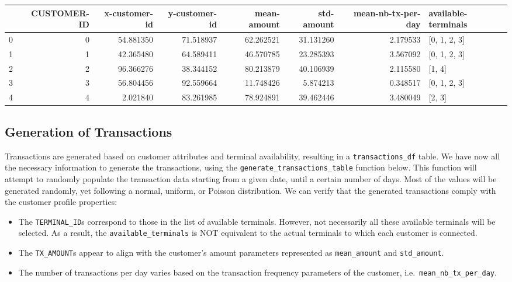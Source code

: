             
    
    \begin{center}
\footnotesize
\begin{tabular}{lrrrrrrl}
\toprule
 & CUSTOMER-ID & x-customer-id & y-customer-id & mean-amount & std-amount & mean-nb-tx-per-day & available-terminals \\
\midrule
0 & 0 & 54.881350 & 71.518937 & 62.262521 & 31.131260 & 2.179533 & [0, 1, 2, 3] \\
1 & 1 & 42.365480 & 64.589411 & 46.570785 & 23.285393 & 3.567092 & [0, 1, 2, 3] \\
2 & 2 & 96.366276 & 38.344152 & 80.213879 & 40.106939 & 2.115580 & [1, 4] \\
3 & 3 & 56.804456 & 92.559664 & 11.748426 & 5.874213 & 0.348517 & [0, 1, 2, 3] \\
4 & 4 & 2.021840 & 83.261985 & 78.924891 & 39.462446 & 3.480049 & [2, 3] \\
\bottomrule
\end{tabular}

\end{center}

    

    \hypertarget{generation-of-transactions}{%
\subsection{Generation of
Transactions}\label{generation-of-transactions}}

    Transactions are generated based on customer attributes and terminal
availability, resulting in a \texttt{transactions\_df} table. We have
now all the necessary information to generate the transactions, using
the \texttt{generate\_transactions\_table} function below. This function
will attempt to randomly populate the transaction data starting from a
given date, until a certain number of days. Most of the values will be
generated randomly, yet following a normal, uniform, or Poisson
distribution. We can verify that the generated transactions comply with
the customer profile properties:

\begin{itemize}
\tightlist
\item
  The \texttt{TERMINAL\_ID}s correspond to those in the list of
  available terminals. However, not necessarily all these available
  terminals will be selected. As a result, the
  \texttt{available\_terminals} is NOT equivalent to the actual
  terminals to which each customer is connected.
\item
  The \texttt{TX\_AMOUNT}s appear to align with the customer's amount
  parameters represented as \texttt{mean\_amount} and
  \texttt{std\_amount}.
\item
  The number of transactions per day varies based on the transaction
  frequency parameters of the customer,
  i.e.~\texttt{mean\_nb\_tx\_per\_day}.
\end{itemize}

